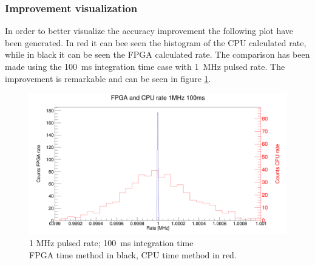 \subsubsection{Improvement visualization}
\noindent In order to better visualize the accuracy improvement the following plot have been generated. In red it can bee seen the histogram of the CPU calculated rate, while in black it can be seen the FPGA calculated rate. The comparison has been made using the 100~ms integration time case with 1~MHz pulsed rate. The improvement is remarkable and can be seen in figure \ref{fig:FPGA_and_CPU_rate_1MHz_100ms}. 
\begin{figure}[H]
	\centering
	\includegraphics[width=0.95\linewidth]{IMG/ch5/RateMeasures/FPGA_and_CPU_rate_1MHz_100ms}
	\caption{1 MHz pulsed rate; 100~ms integration time\\FPGA time method in black, CPU time method in red.}
	\label{fig:FPGA_and_CPU_rate_1MHz_100ms}
\end{figure}










